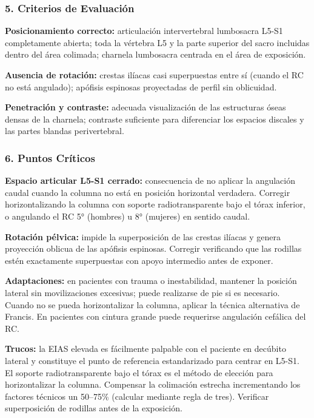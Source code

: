 		\subsubsection*{5. Criterios de Evaluación}
		
		\textbf{Posicionamiento correcto:} articulación intervertebral lumbosacra L5-S1 completamente abierta; toda la vértebra L5 y la parte superior del sacro incluidas dentro del área colimada; charnela lumbosacra centrada en el área de exposición.
		
		\textbf{Ausencia de rotación:} crestas ilíacas casi superpuestas entre sí (cuando el RC no está angulado); apófisis espinosas proyectadas de perfil sin oblicuidad.
		
		\textbf{Penetración y contraste:} adecuada visualización de las estructuras óseas densas de la charnela; contraste suficiente para diferenciar los espacios discales y las partes blandas perivertebral.
		
		\subsubsection*{6. Puntos Críticos}
		
		\textbf{Espacio articular L5-S1 cerrado:} consecuencia de no aplicar la angulación caudal cuando la columna no está en posición horizontal verdadera. Corregir horizontalizando la columna con soporte radiotransparente bajo el tórax inferior, o angulando el RC 5° (hombres) u 8° (mujeres) en sentido caudal.
		
		\textbf{Rotación pélvica:} impide la superposición de las crestas ilíacas y genera proyección oblicua de las apófisis espinosas. Corregir verificando que las rodillas estén exactamente superpuestas con apoyo intermedio antes de exponer.
		
		\textbf{Adaptaciones:} en pacientes con trauma o inestabilidad, mantener la posición lateral sin movilizaciones excesivas; puede realizarse de pie si es necesario. Cuando no se pueda horizontalizar la columna, aplicar la técnica alternativa de Francis. En pacientes con cintura grande puede requerirse angulación cefálica del RC.
		
		\textbf{Trucos:} la EIAS elevada es fácilmente palpable con el paciente en decúbito lateral y constituye el punto de referencia estandarizado para centrar en L5-S1. El soporte radiotransparente bajo el tórax es el método de elección para horizontalizar la columna. Compensar la colimación estrecha incrementando los factores técnicos un 50--75\% (calcular mediante regla de tres). Verificar superposición de rodillas antes de la exposición.
		
